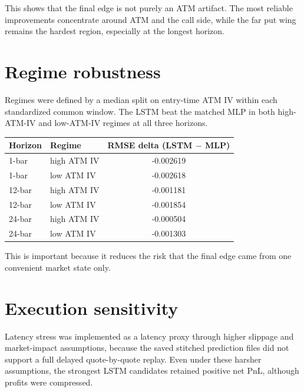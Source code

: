 \documentclass[12pt]{report}
\begin{document}
This shows that the final edge is not purely an ATM artifact. The most reliable improvements concentrate around ATM and the call side, while the far put wing remains the hardest region, especially at the longest horizon.

\section{Regime robustness}
Regimes were defined by a median split on entry-time ATM IV within each standardized common window. The LSTM beat the matched MLP in both high-ATM-IV and low-ATM-IV regimes at all three horizons.

\begin{center}
\begin{tabular}{llc}
\toprule
Horizon & Regime & RMSE delta (LSTM $-$ MLP) \\
\midrule
1-bar & high ATM IV & -0.002619 \\
1-bar & low ATM IV & -0.002618 \\
12-bar & high ATM IV & -0.001181 \\
12-bar & low ATM IV & -0.001854 \\
24-bar & high ATM IV & -0.000504 \\
24-bar & low ATM IV & -0.001303 \\
\bottomrule
\end{tabular}
\end{center}

This is important because it reduces the risk that the final edge came from one convenient market state only.

\section{Execution sensitivity}
Latency stress was implemented as a latency proxy through higher slippage and market-impact assumptions, because the saved stitched prediction files did not support a full delayed quote-by-quote replay. Even under these harsher assumptions, the strongest LSTM candidates retained positive net PnL, although profits were compressed.
\end{document}

